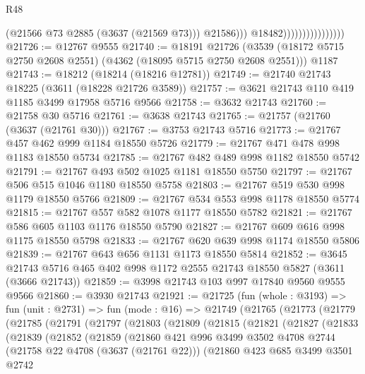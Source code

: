 \begin{lexlean}{R48}
\begin{coremodule}
                                          (@21566 @73 @2885 (@3637 (@21569 @73)))
                                          @21586)))
                                    @18482))))))))))))))))
@21726 := @12767 @9555
@21740 := @18191
    @21726
    (@3539 (@18172 @5715 @2750 @2608 @2551) (@4362 (@18095 @5715 @2750 @2608 @2551)))
    @1187
@21743 := @18212 (@18214 (@18216 @12781))
@21749 := @21740 @21743 @18225 (@3611 (@18228 @21726 @3589))
@21757 := @3621 @21743 @110 @419 @1185 @3499 @17958 @5716 @9566
@21758 := @3632 @21743
@21760 := @21758 @30 @5716
@21761 := @3638 @21743
@21765 := @21757 (@21760 (@3637 (@21761 @30)))
@21767 := @3753 @21743 @5716
@21773 := @21767 @457 @462 @999 @1184 @18550 @5726
@21779 := @21767 @471 @478 @998 @1183 @18550 @5734
@21785 := @21767 @482 @489 @998 @1182 @18550 @5742
@21791 := @21767 @493 @502 @1025 @1181 @18550 @5750
@21797 := @21767 @506 @515 @1046 @1180 @18550 @5758
@21803 := @21767 @519 @530 @998 @1179 @18550 @5766
@21809 := @21767 @534 @553 @998 @1178 @18550 @5774
@21815 := @21767 @557 @582 @1078 @1177 @18550 @5782
@21821 := @21767 @586 @605 @1103 @1176 @18550 @5790
@21827 := @21767 @609 @616 @998 @1175 @18550 @5798
@21833 := @21767 @620 @639 @998 @1174 @18550 @5806
@21839 := @21767 @643 @656 @1131 @1173 @18550 @5814
@21852 := @3645 @21743 @5716 @465 @402 @998 @1172 @2555 @21743 @18550 @5827 (@3611 (@3666 @21743))
@21859 := @3998 @21743 @103 @997 @17840 @9560 @9555 @9566
@21860 := @3930 @21743
@21921 := @21725
    (fun (whole : @3193) =>
    fun (unit : @2731) =>
    fun (mode : @16) =>
    @21749
      (@21765
        (@21773
          (@21779
            (@21785
              (@21791
                (@21797
                  (@21803
                    (@21809
                      (@21815
                        (@21821
                          (@21827
                            (@21833
                              (@21839
                                (@21852
                                  (@21859
                                    (@21860
                                      @421
                                      @996
                                      @3499
                                      @3502
                                      @4708
                                      @2744
                                      (@21758 @22 @4708 (@3637 (@21761 @22)))
                                      (@21860
                                        @423
                                        @685
                                        @3499
                                        @3501
                                        @2742

\end{coremodule}
\end{lexlean}
